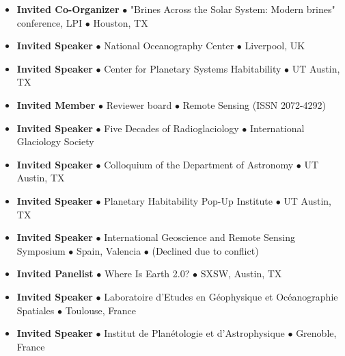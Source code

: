 \begin{itemize}[leftmargin=3.8em, labelsep=1.5em]
    \item[\texttt{2021}] \textbf{Invited Co-Organizer} $\bullet$ "Brines Across the Solar System: Modern brines" conference, LPI $\bullet$ Houston, TX
    
    \item[\texttt{2020}] \textbf{Invited Speaker} $\bullet$ National Oceanography Center $\bullet$ Liverpool, UK
    
    \item[\texttt{2020}] \textbf{Invited Speaker} $\bullet$ Center for Planetary Systems Habitability $\bullet$ UT Austin, TX
    
    \item[2019] \textbf{Invited Member} $\bullet$ Reviewer board $\bullet$ Remote Sensing (ISSN 2072-4292)
    
    \item[\texttt{2019}] \textbf{Invited Speaker} $\bullet$ Five Decades of Radioglaciology $\bullet$ International Glaciology Society
    
    \item[\texttt{2019}] \textbf{Invited Speaker} $\bullet$ Colloquium of the Department of Astronomy $\bullet$ UT Austin, TX
    
    \item[\texttt{2018}] \textbf{Invited Speaker} $\bullet$ Planetary Habitability Pop-Up Institute $\bullet$ UT Austin, TX
    
    \item[\texttt{2018}] \textbf{Invited Speaker} $\bullet$ International Geoscience and Remote Sensing Symposium $\bullet$ Spain, Valencia $\bullet$ (Declined due to conflict)
    
    \item[\texttt{2016}] \textbf{Invited Panelist} $\bullet$ Where Is Earth 2.0? $\bullet$ SXSW, Austin, TX
    
    \item[\texttt{2012}] \textbf{Invited Speaker} $\bullet$ Laboratoire d'Etudes en Géophysique et Océanographie Spatiales $\bullet$ Toulouse, France
    
    \item[\texttt{2012}] \textbf{Invited Speaker} $\bullet$ Institut de Planétologie et d'Astrophysique $\bullet$ Grenoble, France
\end{itemize}